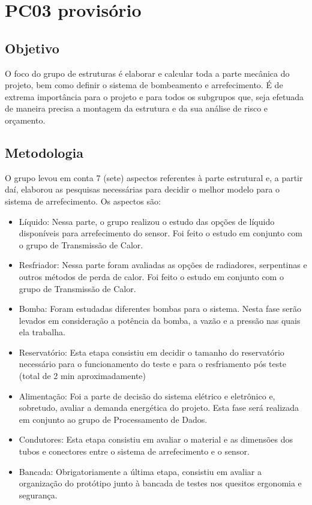 \section{PC03 provisório}

\subsection{Objetivo}

O foco do grupo de estruturas é elaborar e calcular toda a parte mecânica do projeto, bem como definir o sistema de bombeamento e arrefecimento. É de extrema importância para o projeto e para todos os subgrupos que, seja efetuada de maneira precisa a montagem da estrutura e da sua análise de risco e orçamento.

\subsection{Metodologia}
O grupo levou em conta 7 (sete) aspectos referentes à parte estrutural e, a partir daí, elaborou as pesquisas necessárias para decidir o melhor modelo para o sistema de arrefecimento. Os aspectos são:

\begin{itemize}
\item	Líquido: Nessa parte, o grupo realizou o estudo das opções de líquido disponíveis para arrefecimento do sensor. Foi feito o estudo em conjunto com o grupo de Transmissão de Calor.
\item	Resfriador: Nessa parte foram avaliadas as opções de radiadores, serpentinas e outros métodos de perda de calor. Foi feito o estudo em conjunto com o grupo de Transmissão de Calor.
\item	Bomba: Foram estudadas diferentes bombas para o sistema. Nesta fase serão levados em consideração a potência da bomba, a vazão e a pressão nas quais ela trabalha.
\item Reservatório: Esta etapa consistiu em decidir o tamanho do reservatório necessário para o funcionamento do teste e para o resfriamento pós teste (total de 2 min aproximadamente)
\item	Alimentação: Foi a parte de decisão do sistema elétrico e eletrônico e, sobretudo, avaliar a demanda energética do projeto. Esta fase será realizada em conjunto ao grupo de Processamento de Dados.
\item	Condutores: Esta etapa consistiu em avaliar o material e as dimensões dos tubos e conectores entre o sistema de arrefecimento e o sensor.
\item	Bancada: Obrigatoriamente a última etapa, consistiu em avaliar a organização do protótipo junto à bancada de testes nos quesitos ergonomia e segurança.
\end{itemize}

